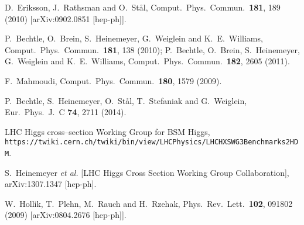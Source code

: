 

  D.~Eriksson, J.~Rathsman and O.~St{\aa}l,
  Comput.\ Phys.\ Commun.\  {\bf 181}, 189 (2010)
  [arXiv:0902.0851 [hep-ph]].

  P.~Bechtle, O.~Brein, S.~Heinemeyer, G.~Weiglein and K.~E.~Williams,
  Comput.\ Phys.\ Commun.\  {\bf 181}, 138 (2010);
  P.~Bechtle, O.~Brein, S.~Heinemeyer, G.~Weiglein and K.~E.~Williams,
  Comput.\ Phys.\ Commun.\  {\bf 182}, 2605 (2011).

  F.~Mahmoudi,
  Comput.\ Phys.\ Commun.\  {\bf 180}, 1579 (2009).

  P.~Bechtle, S.~Heinemeyer, O.~St{\aa}l, T.~Stefaniak and G.~Weiglein,
  Eur.\ Phys.\ J.\ C {\bf 74}, 2711 (2014).

 LHC Higgs cross--section Working Group for BSM Higgs, \\
  \texttt{https://twiki.cern.ch/twiki/bin/view/LHCPhysics/LHCHXSWG3Benchmarks2HDM}.

  S.~Heinemeyer {\it et al.} [LHC Higgs Cross Section Working Group Collaboration],
  arXiv:1307.1347 [hep-ph].


  W.~Hollik, T.~Plehn, M.~Rauch and H.~Rzehak,
  Phys.\ Rev.\ Lett.\  {\bf 102}, 091802 (2009)
  [arXiv:0804.2676 [hep-ph]].

